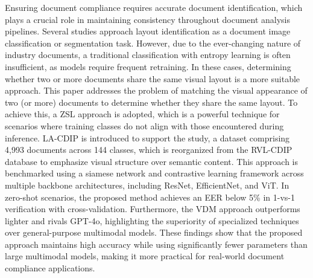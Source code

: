 Ensuring document compliance requires accurate document identification, which plays a crucial role in maintaining consistency throughout document analysis pipelines. Several studies approach layout identification as a document image classification or segmentation task. However, due to the ever-changing nature of industry documents, a traditional classification with entropy learning is often insufficient, as models require frequent retraining. In these cases, determining whether two or more documents share the same visual layout is a more suitable approach.
This paper addresses the problem of matching the visual appearance of two (or more) documents to determine whether they share the same layout. To achieve this, a \acrfull{ZSL} approach is adopted, which is a powerful technique for scenarios where training classes do not align with those encountered during inference. %
\acrfull{LA-CDIP} is introduced to support the study, a dataset comprising 4,993 documents across 144 classes, which is reorganized from the \acrfull{RVL-CDIP} database to emphasize visual structure over semantic content. This approach is benchmarked using a siamese network and contrastive learning framework across multiple backbone architectures, including ResNet, EfficientNet, and \acrfull{ViT}.
In zero-shot scenarios, the proposed method achieves an \acrfull{EER} below 5\% in 1-vs-1 verification with cross-validation. Furthermore, the \acrfull{VDM} approach outperforms lighter  and rivals GPT-4o, highlighting the superiority of specialized techniques over general-purpose multimodal models. These findings show that the proposed approach maintains high accuracy while using significantly fewer parameters than large multimodal models, making it more practical for real-world document compliance applications.


